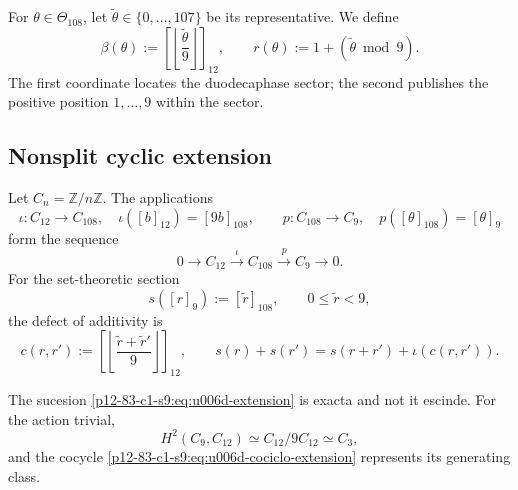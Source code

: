 {For \(\theta\in\Theta_{108}\), let
\(\widetilde\theta\in\{0,\ldots,107\}\) be its representative. We define
\begin{equation}
 \beta(\theta):=
 \left[
 \left\lfloor\frac{\widetilde\theta}{9}\right\rfloor
 \right]_{12},
 \qquad
 r(\theta):=1+(\widetilde\theta\bmod9).
 \label{p12-83-c1-s9:eq:u006d-coordenadas-bloque-residuo}
\end{equation}
The first coordinate locates the duodecaphase sector; the second publishes
the positive position \(1,\ldots,9\) within the sector.

\subsection{Nonsplit cyclic extension}

Let \(C_n=\mathbb Z/n\mathbb Z\). The applications
\begin{equation}
 \iota:C_{12}\longrightarrow C_{108},
 \quad \iota([b]_{12})=[9b]_{108},
 \qquad
 p:C_{108}\longrightarrow C_9,
 \quad p([\theta]_{108})=[\theta]_9
 \label{p12-83-c1-s9:eq:u006d-mapas-extension}
\end{equation}
form the sequence
\begin{equation}
 0\longrightarrow C_{12}
 \xrightarrow{\;\iota\;}C_{108}
 \xrightarrow{\;p\;}C_9
 \longrightarrow0.
 \label{p12-83-c1-s9:eq:u006d-extension}
\end{equation}
For the set-theoretic section
\[
 s([r]_9):=[\widetilde r]_{108},
 \qquad 0\leq\widetilde r<9,
\]
the defect of additivity is
\begin{equation}
 c(r,r'):=
 \left[
 \left\lfloor
 \frac{\widetilde r+\widetilde r'}9
 \right\rfloor
 \right]_{12},
 \qquad
 s(r)+s(r')
 =s(r+r')+\iota(c(r,r')).
 \label{p12-83-c1-s9:eq:u006d-cociclo-extension}
\end{equation}

\begin{theorem}
\label{p12-83-c1-s9:thm:u006d-extension-no-escindida}
The sucesion \eqref{p12-83-c1-s9:eq:u006d-extension} is exacta and not it escinde. For the
action trivial,
\begin{equation}
 H^2(C_9,C_{12})
 \simeq C_{12}/9C_{12}
 \simeq C_3,
 \label{p12-83-c1-s9:eq:u006d-cohomologia-extension}
\end{equation}
and the cocycle \eqref{p12-83-c1-s9:eq:u006d-cociclo-extension} represents its generating
class.
\end{theorem}

}
